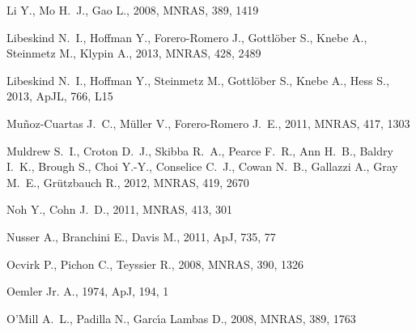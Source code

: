 \documentclass[useAMS,usenatbib]{mn2e}
\newcommand{\apj}{ApJ}
\newcommand{\apjl}{ApJL}
\newcommand{\mnras}{MNRAS}
\begin{document}
\begin{thebibliography}{}
{Li} Y.,  {Mo} H.~J.,    {Gao} L.,  2008, \mnras, 389, 1419

{Libeskind} N.~I.,  {Hoffman} Y.,  {Forero-Romero} J.,  {Gottl{\"o}ber} S.,
  {Knebe} A.,  {Steinmetz} M.,    {Klypin} A.,  2013, \mnras, 428, 2489

{Libeskind} N.~I.,  {Hoffman} Y.,  {Steinmetz} M.,  {Gottl{\"o}ber} S.,
  {Knebe} A.,    {Hess} S.,  2013, \apjl, 766, L15

{Mu{\~n}oz-Cuartas} J.~C.,  {M{\"u}ller} V.,    {Forero-Romero} J.~E.,  2011,
  \mnras, 417, 1303

{Muldrew} S.~I.,  {Croton} D.~J.,  {Skibba} R.~A.,  {Pearce} F.~R.,  {Ann}
  H.~B.,  {Baldry} I.~K.,  {Brough} S.,  {Choi} Y.-Y.,  {Conselice} C.~J.,
  {Cowan} N.~B.,  {Gallazzi} A.,  {Gray} M.~E.,    {Gr{\"u}tzbauch} R.,  2012,
  \mnras, 419, 2670

{Noh} Y.,  {Cohn} J.~D.,  2011, \mnras, 413, 301

{Nusser} A.,  {Branchini} E.,    {Davis} M.,  2011, \apj, 735, 77

{Ocvirk} P.,  {Pichon} C.,    {Teyssier} R.,  2008, \mnras, 390, 1326

{Oemler} Jr. A.,  1974, \apj, 194, 1

{O'Mill} A.~L.,  {Padilla} N.,    {Garc{\'{\i}}a Lambas} D.,  2008, \mnras,
  389, 1763


\end{thebibliography}
\end{document}
